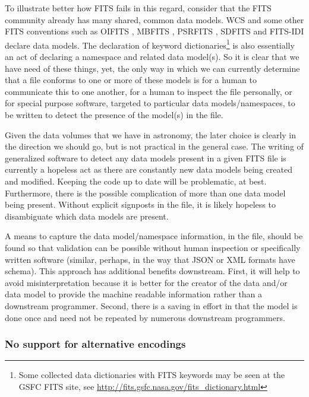 \documentclass[final,authoryear,5p,times,twocolumn]{elsarticle}
\begin{document}
To illustrate better how FITS fails in this regard, consider that the
FITS community already has many shared, common data models. WCS and
some other FITS conventions such as OIFITS
\citep{2006SPIE.6268E.106T}, MBFITS \citep{2006A&A...454L..25M},
PSRFITS \citep{2004PASA...21..302H},
SDFITS \citep{2000ASPC..216..243G} and FITS-IDI \citep{2011AIPS114}
declare data models. The declaration of keyword
dictionaries\footnote{Some collected data dictionaries with FITS
keywords may be seen at the GSFC FITS site, see
\url{http://fits.gsfc.nasa.gov/fits\_dictionary.html}} is also essentially
an act of declaring a namespace and related data model(s). So it is
clear that we have need of these things, yet, the only way in which we
can currently determine that a file conforms to one or more of these
models is for a human to communicate this to one another, for a human
to inspect the file personally, or for special purpose software,
targeted to particular data models/namespaces, to be written to detect
the presence of the model(s) in the file.


Given the data volumes that we have in astronomy, the later choice is
clearly in the direction we should go, but is not practical in the
general case. The writing of generalized software to detect any data
models present in a given FITS file is currently a hopeless act as
there are constantly new data models being created and
modified. Keeping the code up to date will be problematic, at
best. Furthermore, there is the possible complication of more than one
data model being present. Without explicit signposts in the file, it
is likely hopeless to disambiguate which data models are present.


A means to capture the data model/namespace information, in the file,
should be found so that validation can be possible without human
inspection or specifically written software (similar, perhaps, in the
way that JSON or XML formats have schema). This approach has
additional benefits downstream. First, it will help to avoid
misinterpretation because it is better for the creator of the data
and/or data model to provide the machine readable information rather
than a downstream programmer. Second, there is a saving in effort
in that the model is done once and need not be repeated by numerous
downstream programmers.

\subsubsection{No support for alternative encodings}
\end{document}
